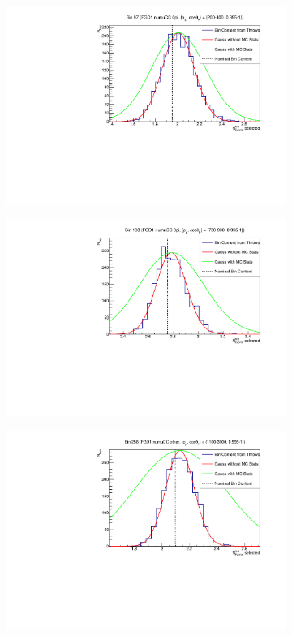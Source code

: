 \begin{figure}
\centering
\begin{subfigure}{.49\textwidth}
  \centering
  \includegraphics[width=0.95\linewidth]{figs/detbin_nopisi97}
\end{subfigure}
\begin{subfigure}{.49\textwidth}
  \centering
  \includegraphics[width=0.95\linewidth]{figs/detbin_nopisi103}
\end{subfigure}
\begin{subfigure}{.49\textwidth}
  \centering
  \includegraphics[width=0.95\linewidth]{figs/detbin_nopisi258}

\end{subfigure}
\end{figure}

